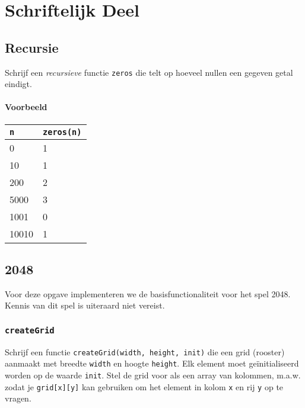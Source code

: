\documentclass{khlexamen}
\begin{document}
\HEADER

\guidelines

\oralpart

\clearpage


\section{Schriftelijk Deel}
\begin{center}
\end{center}

\subsection{Recursie}
Schrijf een \emph{recursieve} functie {\tt zeros} die telt op hoeveel nullen een gegeven getal eindigt.
\paragraph{Voorbeeld}
\begin{center}
  \begin{tabular}{ll}
    {\tt n} & {\tt zeros(n)} \\
    \toprule
    0 & 1 \\
    10 & 1 \\
    200 & 2 \\
    5000 & 3 \\
    1001 & 0 \\
    10010 & 1
  \end{tabular}
\end{center}

\vskip4mm
\answerlines[14]

\clearpage
\SMALLHEADER
\subsection{2048}
Voor deze opgave implementeren we de basisfunctionaliteit voor het spel 2048. Kennis van dit spel is
uiteraard niet vereist.

\subsubsection{{\tt createGrid}}
Schrijf een functie {\tt createGrid(width, height, init)} die een grid (rooster)
aanmaakt met breedte {\tt width} en hoogte {\tt height}. Elk element moet ge\"initialiseerd worden
op de waarde {\tt init}. Stel de grid voor als een array van kolommen, m.a.w. zodat je {\tt grid[x][y]}
kan gebruiken om het element in kolom {\tt x} en rij {\tt y} op te vragen.
\end{document}
